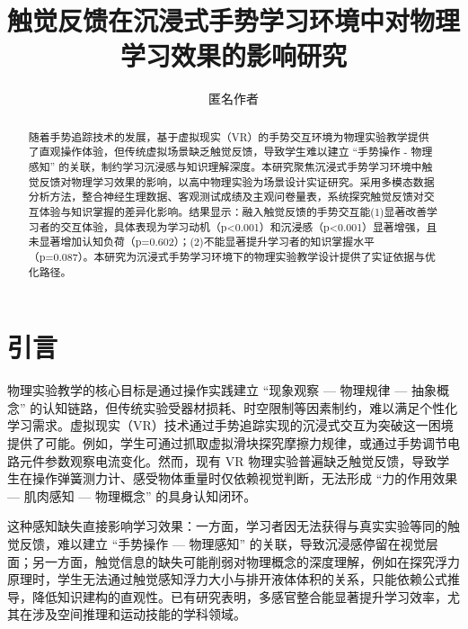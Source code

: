 \documentclass[runningheads]{llncs}
\begin{document}
\title{触觉反馈在沉浸式手势学习环境中对物理学习效果的影响研究}

\author{匿名作者}

\maketitle

\begin{abstract}
  随着手势追踪技术的发展，基于虚拟现实（VR）的手势交互环境为物理实验教学提供了直观操作体验，但传统虚拟场景缺乏触觉反馈，导致学生难以建立 “手势操作 - 物理感知” 的关联，制约学习沉浸感与知识理解深度。本研究聚焦沉浸式手势学习环境中触觉反馈对物理学习效果的影响，以高中物理实验为场景设计实证研究。采用多模态数据分析方法，整合神经生理数据、客观测试成绩及主观问卷量表，系统探究触觉反馈对交互体验与知识掌握的差异化影响。结果显示：融入触觉反馈的手势交互能(1)显著改善学习者的交互体验，具体表现为学习动机（p<0.001）和沉浸感（p<0.001）显著增强，且未显著增加认知负荷（p=0.602）；(2)不能显著提升学习者的知识掌握水平（p=0.087）。本研究为沉浸式手势学习环境下的物理实验教学设计提供了实证依据与优化路径。

\end{abstract}
 
\section{引言}
物理实验教学的核心目标是通过操作实践建立 “现象观察 — 物理规律 — 抽象概念” 的认知链路\cite{civelek2014effects,bao2019physics,freeman2014active}，但传统实验受器材损耗、时空限制等因素制约，难以满足个性化学习需求\cite{yang2007impact,ma2023investigation}。虚拟现实（VR）技术通过手势追踪实现的沉浸式交互为突破这一困境提供了可能\cite{yang2019gesture}。例如，学生可通过抓取虚拟滑块探究摩擦力规律，或通过手势调节电路元件参数观察电流变化。然而，现有 VR 物理实验普遍缺乏触觉反馈，导致学生在操作弹簧测力计、感受物体重量时仅依赖视觉判断，无法形成 “力的作用效果 — 肌肉感知 — 物理概念” 的具身认知闭环\cite{giri2021application}。

这种感知缺失直接影响学习效果：一方面，学习者因无法获得与真实实验等同的触觉反馈，难以建立 “手势操作 — 物理感知” 的关联，导致沉浸感停留在视觉层面；另一方面，触觉信息的缺失可能削弱对物理概念的深度理解，例如在探究浮力原理时，学生无法通过触觉感知浮力大小与排开液体体积的关系，只能依赖公式推导，降低知识建构的直观性。已有研究表明，多感官整合能显著提升学习效率，尤其在涉及空间推理和运动技能的学科领域。
\end{document}
